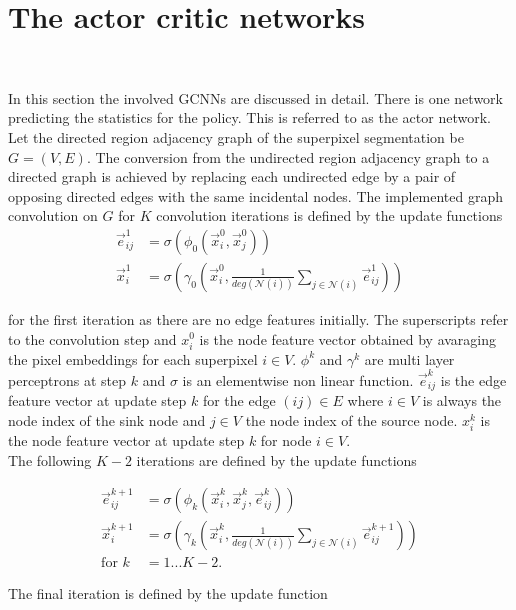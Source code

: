 \section{The actor critic networks}~\label{sec:sag_gcn}

In this section the involved GCNNs are discussed in detail. There is one network predicting the statistics for the policy. This is referred to as the actor network. Let the directed region adjacency graph of the superpixel segmentation be $G=(V,E)$. The conversion from the undirected region adjacency graph to a directed graph is achieved by replacing each undirected edge by a pair of opposing directed edges with the same incidental nodes. The implemented graph convolution on $G$ for $K$ convolution iterations is defined by the update functions\\

\begin{align}
\vec{e}_{ij}^{1} &= \sigma \left( \phi_0 \left(\vec{x}_i^{0}, \vec{x}_j^{0} \right)\right)\\
\vec{x}_i^1 &= \sigma \left( \gamma_0 \left(\vec{x}_i^0, \frac{1}{deg(\mathcal{N}(i))} \sum_{j \in \mathcal{N}(i)}  \vec{e}_{ij}^1 \right)\right)
\end{align}

for the first iteration as there are no edge features initially. The superscripts refer to the convolution step and $x_i^0$ is the node feature vector obtained by avaraging the pixel embeddings for each superpixel $i \in V$. 
$\phi^k$ and $\gamma^k$ are multi layer perceptrons at step $k$ and $\sigma$ is an elementwise non linear function.
$\vec{e}_{ij}^{k}$ is the edge feature vector at update step $k$ for the edge $(ij) \in E$ where $i \in V$ is always the node index of the sink node and $j \in V$ the node index of the source node. $x_i^k$ is the node feature vector at update step $k$ for node $i \in V$.\\
The following $K-2$ iterations are defined by the update functions

\begin{align}
\vec{e}_{ij}^{k+1} &= \sigma \left( \phi_k \left(\vec{x}_i^k, \vec{x}_j^k, \vec{e}_{ij}^k \right)\right)\\
\vec{x}_i^{k+1} &= \sigma \left( \gamma_k \left(\vec{x}_i^k, \frac{1}{deg(\mathcal{N}(i))} \sum_{j \in \mathcal{N}(i)}  \vec{e}_{ij}^{k+1} \right) \right)\\
\text{for }k&=1...K-2 .
\end{align}

The final iteration is defined by the update function

